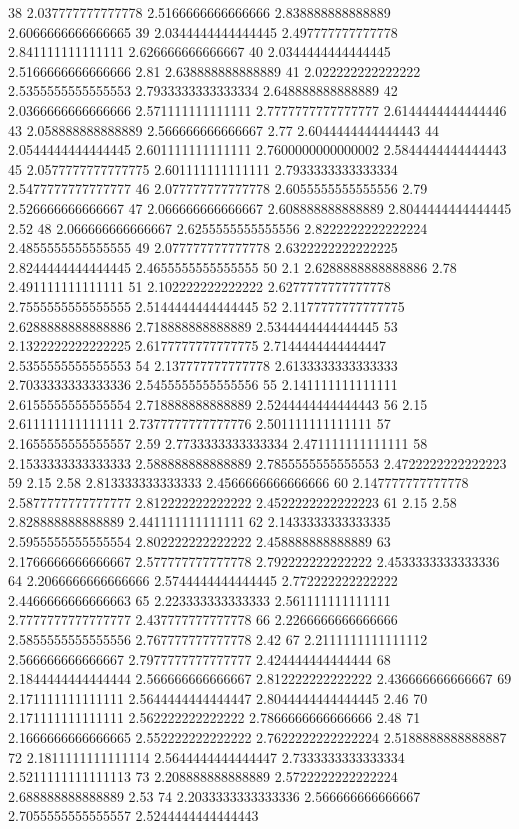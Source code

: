 38 2.037777777777778 2.5166666666666666 2.838888888888889 2.6066666666666665
39 2.0344444444444445 2.497777777777778 2.841111111111111 2.626666666666667
40 2.0344444444444445 2.5166666666666666 2.81 2.638888888888889
41 2.022222222222222 2.5355555555555553 2.7933333333333334 2.648888888888889
42 2.0366666666666666 2.571111111111111 2.7777777777777777 2.6144444444444446
43 2.058888888888889 2.566666666666667 2.77 2.6044444444444443
44 2.0544444444444445 2.601111111111111 2.7600000000000002 2.5844444444444443
45 2.0577777777777775 2.601111111111111 2.7933333333333334 2.5477777777777777
46 2.077777777777778 2.6055555555555556 2.79 2.526666666666667
47 2.066666666666667 2.608888888888889 2.8044444444444445 2.52
48 2.066666666666667 2.6255555555555556 2.8222222222222224 2.4855555555555555
49 2.077777777777778 2.6322222222222225 2.8244444444444445 2.4655555555555555
50 2.1 2.6288888888888886 2.78 2.491111111111111
51 2.102222222222222 2.6277777777777778 2.7555555555555555 2.5144444444444445
52 2.1177777777777775 2.6288888888888886 2.718888888888889 2.5344444444444445
53 2.1322222222222225 2.6177777777777775 2.7144444444444447 2.5355555555555553
54 2.137777777777778 2.6133333333333333 2.7033333333333336 2.5455555555555556
55 2.141111111111111 2.6155555555555554 2.718888888888889 2.5244444444444443
56 2.15 2.611111111111111 2.7377777777777776 2.501111111111111
57 2.1655555555555557 2.59 2.7733333333333334 2.471111111111111
58 2.1533333333333333 2.588888888888889 2.7855555555555553 2.4722222222222223
59 2.15 2.58 2.813333333333333 2.4566666666666666
60 2.147777777777778 2.5877777777777777 2.812222222222222 2.4522222222222223
61 2.15 2.58 2.828888888888889 2.441111111111111
62 2.1433333333333335 2.5955555555555554 2.802222222222222 2.458888888888889
63 2.1766666666666667 2.577777777777778 2.792222222222222 2.4533333333333336
64 2.2066666666666666 2.5744444444444445 2.772222222222222 2.4466666666666663
65 2.223333333333333 2.561111111111111 2.7777777777777777 2.437777777777778
66 2.2266666666666666 2.5855555555555556 2.767777777777778 2.42
67 2.2111111111111112 2.566666666666667 2.7977777777777777 2.424444444444444
68 2.1844444444444444 2.566666666666667 2.812222222222222 2.436666666666667
69 2.171111111111111 2.5644444444444447 2.8044444444444445 2.46
70 2.171111111111111 2.562222222222222 2.7866666666666666 2.48
71 2.1666666666666665 2.552222222222222 2.7622222222222224 2.5188888888888887
72 2.1811111111111114 2.5644444444444447 2.7333333333333334 2.5211111111111113
73 2.208888888888889 2.5722222222222224 2.688888888888889 2.53
74 2.2033333333333336 2.566666666666667 2.7055555555555557 2.5244444444444443
